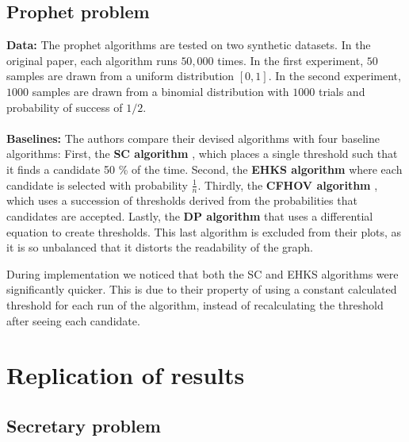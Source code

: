 \subsection{Prophet problem}
\textbf{Data:}
The prophet algorithms are tested on two synthetic datasets. In the original paper, each algorithm runs $50,000$ times. In the first experiment, $50$ samples are drawn from a uniform distribution $[0,1]$. In the second experiment, $1000$ samples are drawn from a binomial distribution with $1000$ trials and probability of success of $1/2$.
\\ \\
\textbf{Baselines:}
The authors compare their devised algorithms with four baseline algorithms: First, the \textbf{SC algorithm} \cite{SamualCahn1984}, which places a single threshold such that it finds a candidate 50 \% of the time. Second, the \textbf{EHKS algorithm }\cite{Ehsani2017} where each candidate is selected with probability $\frac{1}{n}$. Thirdly,  the \textbf{CFHOV algorithm} \cite{correa21b}, which uses a succession of thresholds derived from the probabilities that  candidates are accepted.
Lastly, the \textbf{DP algorithm} \cite{Chow1971} that uses a differential equation to create thresholds. This last algorithm is excluded from their plots, as it is so unbalanced that it distorts the readability of the graph.

During implementation we noticed that both the SC and EHKS algorithms were significantly quicker. This is due to their property of using a constant calculated threshold for each run of the algorithm, instead of recalculating the threshold after seeing each candidate.

\section{Replication of results}

\subsection{Secretary problem}

